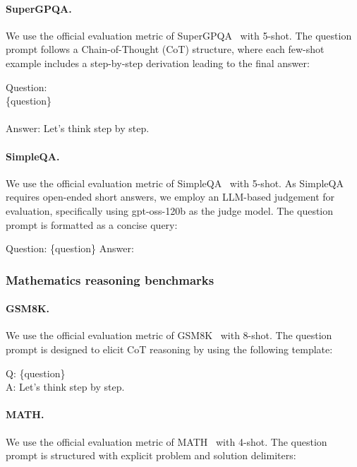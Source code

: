 \paragraph{SuperGPQA.} We use the official evaluation metric of SuperGPQA~\cite{du2025supergpqa} with 5-shot. The question prompt follows a Chain-of-Thought (CoT) structure, where each few-shot example includes a step-by-step derivation leading to the final answer:

\begin{MyBox}{}

    Question:\\
    \{question\}\\
    \\
    Answer: Let's think step by step.
\end{MyBox}

\paragraph{SimpleQA.} We use the official evaluation metric of SimpleQA~\cite{openai2024simpleqa} with 5-shot. As SimpleQA requires open-ended short answers, we employ an LLM-based judgement for evaluation, specifically using gpt-oss-120b\cite{openai2025gptoss120bgptoss20bmodel} as the judge model. The question prompt is formatted as a concise query:

\begin{MyBox}{}

    Question: \{question\} Answer:
\end{MyBox}

\subsubsection{Mathematics reasoning benchmarks}

\paragraph{GSM8K.} We use the official evaluation metric of GSM8K~\cite{cobbe2021gsm8k} with 8-shot. The question prompt is designed to elicit CoT reasoning by using the following template:

\begin{MyBox}{}

    Q: \{question\}\\
    A: Let’s think step by step.
\end{MyBox}

\paragraph{MATH.} We use the official evaluation metric of MATH~\cite{hendrycks2021math} with 4-shot. The question prompt is structured with explicit problem and solution delimiters:

